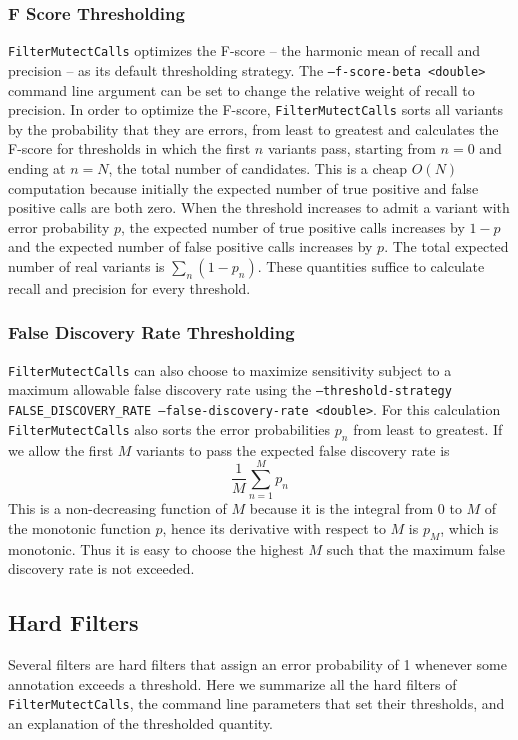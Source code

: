 \documentclass[nofootinbib,amssymb,amsmath]{revtex4}
\newcommand{\code}[1]{\texttt{#1}}
\begin{document}
\subsubsection{F Score Thresholding}
\code{FilterMutectCalls} optimizes the F-score -- the harmonic mean of recall and precision -- as its default thresholding strategy.  The \code{--f-score-beta <double>} command line argument can be set to change the relative weight of recall to precision.  In order to optimize the F-score, \code{FilterMutectCalls} sorts all variants by the probability that they are errors, from least to greatest and calculates the F-score for thresholds in which the first $n$ variants pass, starting from $n = 0$ and ending at $n = N$, the total number of candidates.  This is a cheap $O(N)$ computation because initially the expected number of true positive and false positive calls are both zero.  When the threshold increases to admit a variant with error probability $p$, the expected number of true positive calls increases by $1 - p$ and the expected number of false positive calls increases by $p$.  The total expected number of real variants is $\sum_n (1 - p_n)$.  These quantities suffice to calculate recall and precision for every threshold.

\subsubsection{False Discovery Rate Thresholding}
\code{FilterMutectCalls} can also choose to maximize sensitivity subject to a maximum allowable false discovery rate using the \code{--threshold-strategy FALSE\_DISCOVERY\_RATE --false-discovery-rate <double>}.  For this calculation \code{FilterMutectCalls} also sorts the error probabilities $p_n$ from least to greatest.  If we allow the first $M$ variants to pass the expected false discovery rate is
\begin{equation}
\frac{1}{M} \sum_{n = 1}^{M} p_n
\end{equation}
This is a non-decreasing function of $M$ because it is the integral from $0$ to $M$ of the monotonic function $p$, hence its derivative with respect to $M$ is $p_M$, which is monotonic.  Thus it is easy to choose the highest $M$ such that the maximum false discovery rate is not exceeded.

\subsection{Hard Filters}
Several filters are hard filters that assign an error probability of 1 whenever some annotation exceeds a threshold.  Here we summarize all the hard filters of \code{FilterMutectCalls}, the command line parameters that set their thresholds, and an explanation of the thresholded quantity.
\end{document}
